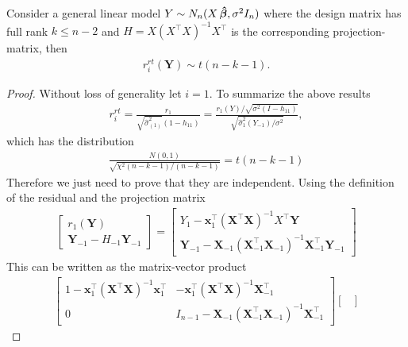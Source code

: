 \begin{proposition}
    Consider a general linear model $Y \sim N_n(X \operatorname{\boldsymbol{\hat{\beta}}}, \sigma^2 I_n)$ where the design matrix has full rank $k \leq n-2$ and $H = X (X^\top X)^{-1}X^\top$ is the corresponding projection-matrix, then
    \begin{align*}
        r_i^{rt}(\textbf{Y}) \sim t(n-k-1).
    \end{align*}
\end{proposition}
\begin{proof}
    Without loss of generality let $i=1$. 
    To summarize the above results
    \begin{align*}
        r_i^{rt} = \frac{r_1}{\sqrt{\hat{\sigma}^2_{(1)}}(1-h_{11})}
        =
        \frac{r_1(Y)/ \sqrt{\sigma^2 (I-h_{11})}}{\sqrt{\hat{\sigma}_1^2 (Y_{-1})/\sigma^2}},
    \end{align*}
    which has the distribution
    \begin{align*}
        \frac{N(0,1)}{\sqrt{\chi^2(n-k-1)/(n-k-1)}} = t(n-k-1)
    \end{align*}
    Therefore we just need to prove that they are independent.
    Using the definition of the residual and the projection matrix
    \begin{align*}
        \begin{bmatrix}
            r_1(\textbf{Y}) \\
            \textbf{Y}_{-1} - H_{-1} \textbf{Y}_{-1}
        \end{bmatrix}
        =
        \begin{bmatrix}
            Y_1 - \textbf{x}_1^\top (\textbf{X}^\top \textbf{X})^{-1} X^\top \textbf{Y} \\
            \textbf{Y}_{-1} - \textbf{X}_{-1} (\textbf{X}_{-1}^\top \textbf{X}_{-1})^{-1} \textbf{X}_{-1}^\top \textbf{Y}_{-1}
        \end{bmatrix}
    \end{align*}
    This can be written as the matrix-vector product
    \begin{align*}
        \begin{bmatrix}
            1 - \textbf{x}_1^\top (\textbf{X}^\top \textbf{X})^{-1} \textbf{x}_1^\top & - \textbf{x}_1^\top (\textbf{X}^\top \textbf{X})^{-1} \textbf{X}_{-1}^\top \\
            0 & I_{n-1} - \textbf{X}_{-1} (\textbf{X}_{-1}^\top \textbf{X}_{-1})^{-1} \textbf{X}_{-1}^\top
        \end{bmatrix}
        \begin{bmatrix}

\end{bmatrix}
\end{align*}
\end{proof}
